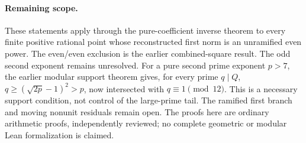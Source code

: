 \paragraph{Remaining scope.}
These statements apply through the pure-coefficient inverse theorem to
every finite positive rational point whose reconstructed first norm is
an unramified even power. The even/even exclusion is the earlier
combined-square result. The odd second exponent remains unresolved.
For a pure second prime exponent $p>7$, the earlier modular support
theorem gives, for every prime $q\mid Q$,
$q\ge(\sqrt{2p}-1)^2>p$, now intersected with $q\equiv1\pmod{12}$.
This is a necessary support condition, not control of the large-prime
tail. The ramified first branch and moving nonunit residuals remain
open. The proofs here are ordinary arithmetic proofs, independently
reviewed; no complete geometric or modular Lean formalization is claimed.
